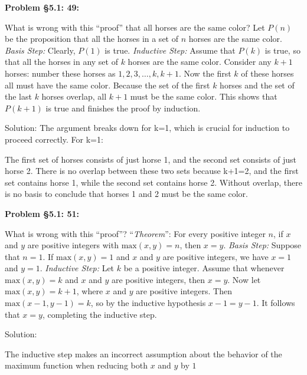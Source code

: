 \documentclass{article}
\newenvironment{problem}[1]
{\begin{mdframed}[default]
\textbf{Problem #1:}
}
{\end{mdframed}
}
\begin{document}
\begin{problem}{\S 5.1: 49}
What is wrong with this ``proof'' that all horses are the same color?
\vspace{3mm}
\noindent Let $P(n)$ be the proposition that all the horses in a set of $n$ horses
are the same color.
\vspace{2mm}
\noindent \emph{Basis Step:} Clearly, $P(1)$ is true.
\vspace{2mm}
\noindent \emph{Inductive Step:} Assume that $P(k)$ is true, so that all the horses
in any set of $k$ horses are the same color. Consider any $k+1$ horses: number
these horses as $1, 2, 3, \dots, k, k+1$. Now the first $k$ of these horses all
must have the same color. Because the set of the first $k$ horses and the set of
the last $k$ horses overlap, all $k+1$ must be the same color. This shows that
$P(k+1)$ is true and finishes the proof by induction.
\end{problem}

Solution:
The argument breaks down for k=1, which is crucial for induction to proceed correctly.
For k=1:

The first set of horses consists of just horse 1, and the second set consists of just horse 2.
There is no overlap between these two sets because 
k+1=2, and the first set contains horse 1, while the second set contains horse 2.
Without overlap, there is no basis to conclude that horses 1 and 2 must be the same color.

\begin{problem}{\S 5.1: 51}
What is wrong with this ``proof''?
\vspace{3mm}
\noindent ``\emph{Theorem}'': For every positive integer $n$, if $x$ and $y$ are
positive integers with $\textrm{max}(x,y) = n$, then $x = y$.
\vspace{2mm}
\noindent \emph{Basis Step:} Suppose that $n=1$. If $\textrm{max}(x,y)=1$ and $x$
and $y$ are positive integers, we have $x = 1$ and $y = 1$.
\vspace{2mm}
\noindent \emph{Inductive Step:} Let $k$ be a positive integer. Assume that
whenever $\textrm{max}(x,y) = k$ and $x$ and $y$ are positive integers, then $x =
y$. Now let $\textrm{max}(x,y) = k+1$, where $x$ and $y$ are positive integers.
Then $\textrm{max}(x-1,y-1) = k$, so by the inductive hypothesis $x-1 = y-1$. It
follows that $x = y$, completing the inductive step.
\end{problem}

Solution:

The inductive step makes an incorrect assumption about the behavior of the maximum function when reducing both $x$ and $y$ by $1$
\end{document}
